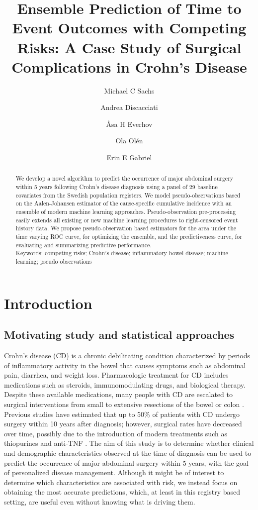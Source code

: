 \documentclass{statsoc}
\title[Ensemble Prediction for CD]{Ensemble Prediction of Time to Event Outcomes with Competing Risks: A Case Study of Surgical Complications in Crohn's Disease}
\author{Michael C Sachs}
\author{Andrea Discacciati}
\author{Åsa H Everhov}
\author{Ola Olén}
\author[Michael C Sachs {\it et al.}]{Erin E Gabriel}
\begin{document}
  
\begin{abstract} We develop a novel algorithm to predict the occurrence of major abdominal surgery within 5 years following Crohn's disease diagnosis using a panel of 29 baseline covariates from the Swedish population registers. We model pseudo-observations based on the Aalen-Johansen estimator of the cause-specific cumulative incidence with an ensemble of modern machine learning approaches. Pseudo-observation pre-processing easily extends all existing or new machine learning procedures to right-censored event history data. We propose pseudo-observation based estimators for the area under the time varying ROC curve, for optimizing the ensemble, and the predictiveness curve, for evaluating and summarizing predictive performance. \\
Keywords: competing risks; Crohn's disease; inflammatory bowel disease; machine learning; pseudo observations
\end{abstract}


\section{Introduction}
\label{sec:intro}

\subsection{Motivating study and statistical approaches}
Crohn's disease (CD) is a chronic debilitating condition characterized by periods of inflammatory activity in the bowel that causes symptoms such as abdominal pain, diarrhea, and weight loss. Pharmacologic treatment for CD includes medications such as steroids, immunomodulating drugs, and biological therapy. Despite these available medications, many people with CD are escalated to surgical interventions from small to extensive resections of the bowel or colon \citep{gomollon20163rd}. Previous studies have estimated that up to 50\% of patients with CD undergo surgery within 10 years after diagnosis; however, surgical rates have decreased over time, possibly due to the introduction of modern treatments such as thiopurines and anti-TNF \citep{lakatos2012has,ramadas2010natural}. The aim of this study is to determine whether clinical and demographic characteristics observed at the time of diagnosis can be used to predict the occurrence of major abdominal surgery within 5 years, with the goal of personalized disease management. Although it might be of interest to determine which characteristics are associated with risk, we instead focus on obtaining the most accurate predictions, which, at least in this registry based setting, are useful even without knowing what is driving them.  
\end{document}
